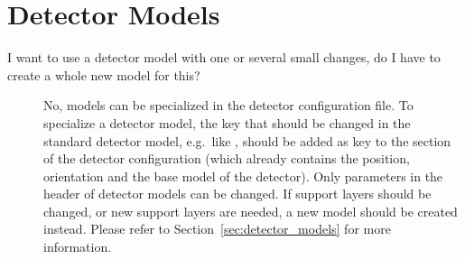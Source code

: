 \section{Detector Models}
\begin{description}
\item[I want to use a detector model with one or several small changes, do I have to create a whole new model for this?] No, models can be specialized in the detector configuration file.
To specialize a detector model, the key that should be changed in the standard detector model, e.g.\ like , should be added as key to the section of the detector configuration (which already contains the position, orientation and the base model of the detector).
Only parameters in the header of detector models can be changed.
If support layers should be changed, or new support layers are needed, a new model should be created instead.
Please refer to Section~\ref{sec:detector_models} for more information.
\end{description}

